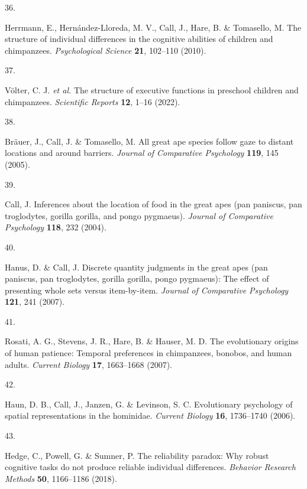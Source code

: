 \documentclass[
  man,floatsintext]{apa6}
\newlength{\cslhangindent}
\newlength{\csllabelwidth}
\newlength{\cslentryspacingunit} %
\newenvironment{CSLReferences}[2] %
 {%
  \setlength{\parindent}{0pt}
  \ifodd #1
  \let\oldpar\par
  \def\par{\hangindent=\cslhangindent\oldpar}
  \fi
  \setlength{\parskip}{#2\cslentryspacingunit}
 }%
 {}
\newcommand{\CSLLeftMargin}[1]{\parbox[t]{\csllabelwidth}{#1}}
\newcommand{\CSLRightInline}[1]{\parbox[t]{\linewidth - \csllabelwidth}{#1}\break}
\begin{document}
\begin{CSLReferences}{0}{0}
\leavevmode{}%
\CSLLeftMargin{36. }%
\CSLRightInline{Herrmann, E., Hernández-Lloreda, M. V., Call, J., Hare, B. \& Tomasello, M. The structure of individual differences in the cognitive abilities of children and chimpanzees. \emph{Psychological Science} \textbf{21}, 102--110 (2010).}

\leavevmode{}%
\CSLLeftMargin{37. }%
\CSLRightInline{Völter, C. J. \emph{et al.} The structure of executive functions in preschool children and chimpanzees. \emph{Scientific Reports} \textbf{12}, 1--16 (2022).}

\leavevmode{}%
\CSLLeftMargin{38. }%
\CSLRightInline{Bräuer, J., Call, J. \& Tomasello, M. All great ape species follow gaze to distant locations and around barriers. \emph{Journal of Comparative Psychology} \textbf{119}, 145 (2005).}

\leavevmode{}%
\CSLLeftMargin{39. }%
\CSLRightInline{Call, J. Inferences about the location of food in the great apes (pan paniscus, pan troglodytes, gorilla gorilla, and pongo pygmaeus). \emph{Journal of Comparative Psychology} \textbf{118}, 232 (2004).}

\leavevmode{}%
\CSLLeftMargin{40. }%
\CSLRightInline{Hanus, D. \& Call, J. Discrete quantity judgments in the great apes (pan paniscus, pan troglodytes, gorilla gorilla, pongo pygmaeus): The effect of presenting whole sets versus item-by-item. \emph{Journal of Comparative Psychology} \textbf{121}, 241 (2007).}

\leavevmode{}%
\CSLLeftMargin{41. }%
\CSLRightInline{Rosati, A. G., Stevens, J. R., Hare, B. \& Hauser, M. D. The evolutionary origins of human patience: Temporal preferences in chimpanzees, bonobos, and human adults. \emph{Current Biology} \textbf{17}, 1663--1668 (2007).}

\leavevmode{}%
\CSLLeftMargin{42. }%
\CSLRightInline{Haun, D. B., Call, J., Janzen, G. \& Levinson, S. C. Evolutionary psychology of spatial representations in the hominidae. \emph{Current Biology} \textbf{16}, 1736--1740 (2006).}

\leavevmode{}%
\CSLLeftMargin{43. }%
\CSLRightInline{Hedge, C., Powell, G. \& Sumner, P. The reliability paradox: Why robust cognitive tasks do not produce reliable individual differences. \emph{Behavior Research Methods} \textbf{50}, 1166--1186 (2018).}


\end{CSLReferences}
\end{document}
